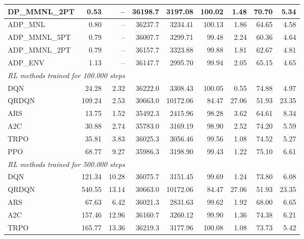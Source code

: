 \begin{samepage}
\begin{center}
\begin{tabular}{l|rr|rr|rr|rr}
    DP\_MMNL\_2PT &     0.53 &    -- &    36198.7 &    3197.08 &  100.02 &    1.48 &   70.70 &    5.34 \\
    \midrule
    ADP\_MNL     &     0.80 &    -- &    36237.7 &    3234.41 &  100.13 &    1.86 &   64.65 &    4.58 \\
    ADP\_MMNL\_5PT &     0.79 &    -- &    36007.7 &    3299.71 &   99.48 &    2.24 &   60.36 &    4.64 \\
    ADP\_MMNL\_2PT &     0.79 &    -- &    36157.7 &    3323.88 &   99.88 &    1.81 &   62.67 &    4.81 \\
    ADP\_ENV     &     1.13 &    -- &    36147.7 &    2995.70 &   99.94 &    2.05 &   65.15 &    4.65 \\
    \midrule
    \multicolumn{9}{l}{\textit{RL methods trained for 100.000 steps}} \\
    \midrule
    DQN          &    24.28 &     2.32 &    36222.0 &    3308.43 &  100.05 &    0.55 &   74.88 &    4.97 \\
    QRDQN        &   109.24 &     2.53 &    30663.0 &   10172.06 &   84.47 &   27.06 &   51.93 &   23.35 \\
    ARS          &    13.75 &     1.52 &    35492.3 &    2415.96 &   98.28 &    3.62 &   64.61 &    8.34 \\
    A2C          &    30.88 &     2.74 &    35783.0 &    3169.19 &   98.90 &    2.52 &   74.20 &    5.59 \\
    TRPO         &    35.81 &     3.83 &    36025.3 &    3056.46 &   99.56 &    1.08 &   74.52 &    5.27 \\
    PPO          &    68.77 &     9.27 &    35986.3 &    3198.90 &   99.43 &    1.22 &   75.10 &    6.61 \\
    \midrule
    \multicolumn{9}{l}{\textit{RL methods trained for 500.000 steps}} \\
    \midrule
    DQN          &   121.34 &    10.28 &    36075.7 &    3151.45 &   99.69 &    1.24 &   73.80 &    6.08 \\
    QRDQN        &   540.55 &    13.14 &    30663.0 &   10172.06 &   84.47 &   27.06 &   51.93 &   23.35 \\
    ARS          &    67.63 &     6.42 &    36021.3 &    2831.63 &   99.62 &    1.92 &   68.00 &    6.65 \\
    A2C          &   157.46 &    12.96 &    36160.7 &    3260.12 &   99.90 &    1.36 &   74.38 &    6.21 \\
    TRPO         &   165.77 &    13.36 &    36219.3 &    3177.96 &  100.08 &    1.08 &   73.73 &    5.42 \\

\end{tabular}
\end{center}
\end{samepage}
